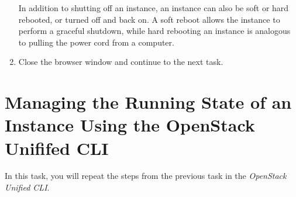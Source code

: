 \documentclass[letterpaper, 12pt]{article}
\begin{document}
\begin{enumerate}
    \begin{tipbox}
        In addition to shutting off an instance, an instance can also be soft or hard rebooted, or turned off and back
        on. A soft reboot allows the instance to perform a graceful shutdown, while hard rebooting an instance is
        analogous to pulling the power cord from a computer.
    \end{tipbox}

    \item Close the browser window and continue to the next task.
\end{enumerate}

\section{Managing the Running State of an Instance Using the OpenStack Unififed CLI}
\label{sec:managing_the_power_state_of_an_instance_cli}
In this task, you will repeat the steps from the previous task in the \textit{OpenStack Unified CLI}.
\end{document}
